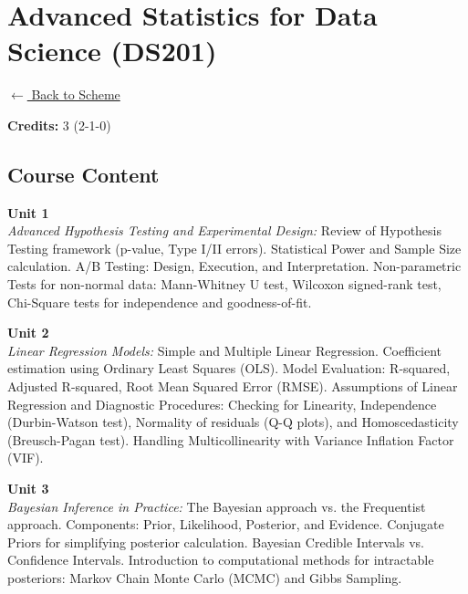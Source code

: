 \section*{Advanced Statistics for Data Science (DS201)}
\label{major:DS_1}

\noindent \small{\hyperref[main:scheme]{$\leftarrow$ Back to Scheme}} \vspace{0.5cm}

\noindent \textbf{Credits:} 3 (2-1-0)

\subsection*{Course Content}
\noindent\textbf{Unit 1} \\
\textit{Advanced Hypothesis Testing and Experimental Design:} Review of Hypothesis Testing framework (p-value, Type I/II errors). Statistical Power and Sample Size calculation. A/B Testing: Design, Execution, and Interpretation. Non-parametric Tests for non-normal data: Mann-Whitney U test, Wilcoxon signed-rank test, Chi-Square tests for independence and goodness-of-fit.

\vspace{0.3cm}

\noindent\textbf{Unit 2} \\
\textit{Linear Regression Models:} Simple and Multiple Linear Regression. Coefficient estimation using Ordinary Least Squares (OLS). Model Evaluation: R-squared, Adjusted R-squared, Root Mean Squared Error (RMSE). Assumptions of Linear Regression and Diagnostic Procedures: Checking for Linearity, Independence (Durbin-Watson test), Normality of residuals (Q-Q plots), and Homoscedasticity (Breusch-Pagan test). Handling Multicollinearity with Variance Inflation Factor (VIF).

\vspace{0.3cm}

\noindent\textbf{Unit 3} \\
\textit{Bayesian Inference in Practice:} The Bayesian approach vs. the Frequentist approach. Components: Prior, Likelihood, Posterior, and Evidence. Conjugate Priors for simplifying posterior calculation. Bayesian Credible Intervals vs. Confidence Intervals. Introduction to computational methods for intractable posteriors: Markov Chain Monte Carlo (MCMC) and Gibbs Sampling.

\vspace{0.3cm}

